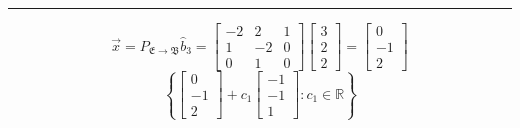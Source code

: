 \documentclass{report}
\begin{document}
\vspace{0.5em}
\hrule
\vspace{1em}
$$
\vec{x} = P_{\mathfrak{E}\rightarrow\mathfrak{B}}\hat{b}_3 = \begin{bmatrix}-2&2&1\\1&-2&0\\0&1&0\end{bmatrix}\begin{bmatrix}3\\2\\2\end{bmatrix} = \begin{bmatrix}0\\-1\\2\end{bmatrix}
$$
$$
\left\{
\begin{bmatrix}0\\-1\\2\end{bmatrix}+ c_1\begin{bmatrix}-1\\-1\\1\end{bmatrix} : c_1 \in \mathbb{R}
\right\}
$$
\end{document}
